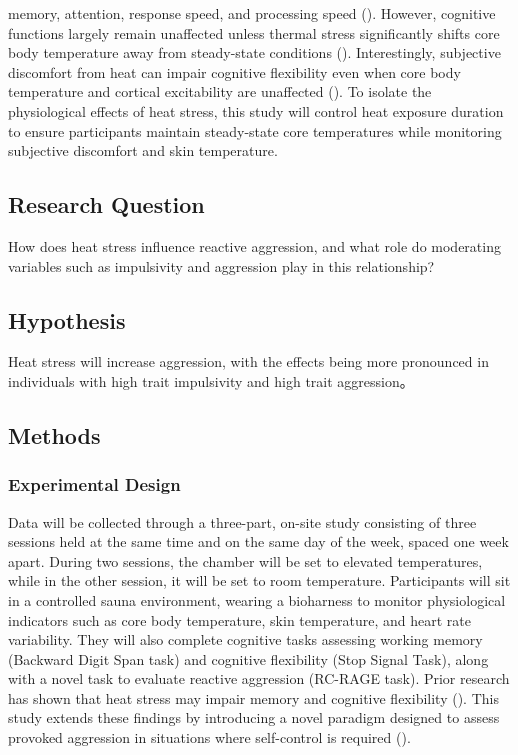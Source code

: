 \documentclass[
  man,
  floatsintext,
  longtable,
  nolmodern,
  notxfonts,
  notimes,
  colorlinks=true,linkcolor=blue,citecolor=blue,urlcolor=blue]{apa7}
\begin{document}
memory, attention, response speed, and processing speed
().
However, cognitive functions largely remain unaffected unless thermal
stress significantly shifts core body temperature away from steady-state
conditions (). Interestingly, subjective discomfort from heat can
impair cognitive flexibility even when core body temperature and
cortical excitability are unaffected
(). To isolate the physiological effects of heat stress, this study
will control heat exposure duration to ensure participants maintain
steady-state core temperatures while monitoring subjective discomfort
and skin temperature.

\subsection{Research Question}\label{research-question}

How does heat stress influence reactive aggression, and what role do
moderating variables such as impulsivity and aggression play in this
relationship?

\subsection{Hypothesis}\label{hypothesis}

Heat stress will increase aggression, with the effects being more
pronounced in individuals with high trait impulsivity and high trait
aggression。

\subsection{Methods}\label{sec-methods}

\subsubsection{Experimental Design}\label{experimental-design}

Data will be collected through a three-part, on-site study consisting of
three sessions held at the same time and on the same day of the week,
spaced one week apart. During two sessions, the chamber will be set to
elevated temperatures, while in the other session, it will be set to
room temperature. Participants will sit in a controlled sauna
environment, wearing a bioharness to monitor physiological indicators
such as core body temperature, skin temperature, and heart rate
variability. They will also complete cognitive tasks assessing working
memory (Backward Digit Span task) and cognitive flexibility (Stop Signal
Task), along with a novel task to evaluate reactive aggression (RC-RAGE
task). Prior research has shown that heat stress may impair memory and
cognitive flexibility
(). This study extends these findings by introducing a novel
paradigm designed to assess provoked aggression in situations where
self-control is required
().
\end{document}
